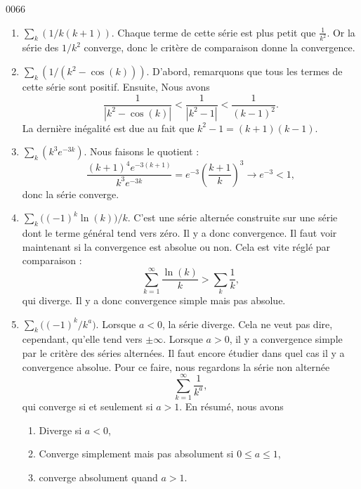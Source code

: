 \begin{corrige}{0066}
\begin{enumerate}
\item
$\sum_k(1/k(k+1))$.
Chaque terme de cette série est plus petit que $\frac{1}{ k^2 }$. Or la série des $1/k^2$ converge, donc le critère de comparaison donne la convergence.

\item
$\sum_k(1/(k^2-\cos(k)))$. D'abord, remarquons que tous les termes de cette série sont positif. Ensuite, Nous avons
\begin{equation}
	\frac{1}{ | k^2-\cos(k) | }<\frac{1}{ | k^2-1 | }<\frac{1}{ (k-1)^2 }.
\end{equation}
La dernière inégalité est due au fait que $k^2-1=(k+1)(k-1)$.

\item
$\sum_k(k^3 e^{-3k})$.
Nous faisons le quotient :
\begin{equation}
	\frac{ (k+1)^4 e^{-3(k+1)} }{ k^3 e^{-3k} }= e^{-3}\left( \frac{ k+1 }{ k } \right)^3\to e^{-3}<1,
\end{equation}
donc la série converge.

\item
$\sum_k \big( (-1)^k\ln(k) \big)/k$. C'est une série alternée construite sur une série dont le terme général tend vers zéro. Il y a donc convergence. Il faut voir maintenant si la convergence est absolue ou non. Cela est vite réglé par comparaison :
\begin{equation}
	\sum_{k=1}^{\infty}\frac{ \ln(k) }{ k }>\sum_k\frac{1}{ k },
\end{equation}
qui diverge. Il y a donc convergence simple mais pas absolue.

\item
$\sum_k\big( (-1)^k/k^a \big)$.
Lorsque $a<0$, la série diverge. Cela ne veut pas dire, cependant, qu'elle tend vers $\pm \infty$. Lorsque $a>0$, il y a convergence simple par le critère des séries alternées. Il faut encore étudier dans quel cas il y a convergence absolue. Pour ce faire, nous regardons la série non alternée
\begin{equation}
	\sum_{k=1}^{\infty}\frac{1}{ k^a },
\end{equation}
qui converge si et seulement si $a>1$. En résumé, nous avons
\begin{enumerate}
\item Diverge si $a<0$,
\item Converge simplement mais pas absolument si $0\leq a\leq 1$,
\item converge absolument quand $a>1$.
\end{enumerate}


\end{enumerate}
\end{corrige}
